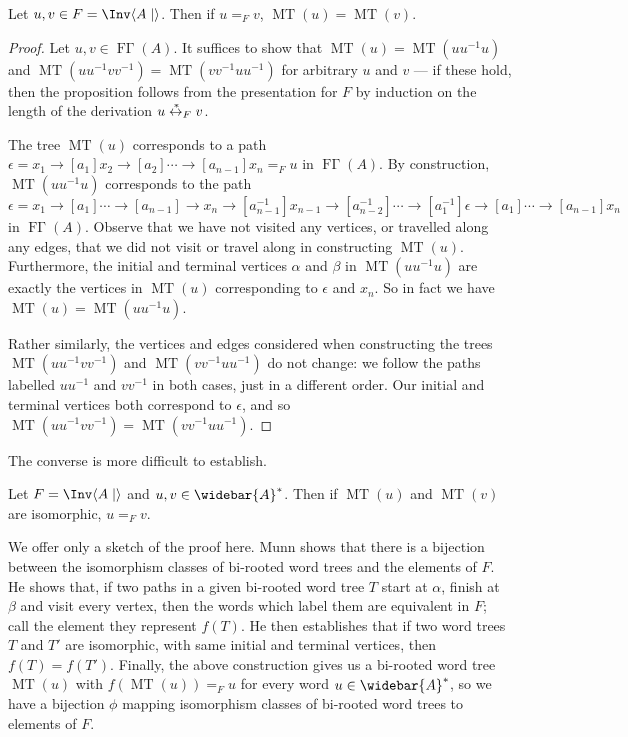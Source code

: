 \documentclass[noindex,noinsetproof,emphthm,12pt]{lmaths}
\newcommand{\leftrightst}{\mathrel{\smash{\stackrel{\hspace{0.1em}\ast}{\leftrightarrow}}}}
\newcommand{\Abar}{\widebar{A}}
\DeclareMathOperator{\FGamma}{F\Gamma}
\DeclareMathOperator{\MT}{MT}
\begin{document}
\begin{prop}
	Let $u, v \in F = \Inv \langle A \mid\rangle$. Then if $u =_F v$, $\MT(u) = \MT(v)$.
\end{prop}
\begin{proof}
	Let $u, v \in \FGamma(A)$. It suffices to show that $\MT(u) = \MT(uu^{-1}u)$ and $\MT(uu^{-1}vv^{-1}) = \MT(vv^{-1}uu^{-1})$ for arbitrary $u$ and $v$ --- if these hold, then the proposition follows from the presentation for $F$ by induction on the length of the derivation $u \leftrightst_{F} v$.

	The tree $\MT(u)$ corresponds to a path $\epsilon = x_1 \to[a_1] x_2 \to[a_2] \cdots \to[a_{n-1}] x_n =_F u$ in $\FGamma(A)$. By construction, $\MT(uu^{-1}u)$ corresponds to the path $\epsilon = x_1 \to[a_1] \cdots \to[a_{n-1}] \to x_n \to[a_{n-1}^{-1}] x_{n-1} \to[a_{n-2}^{-1}] \cdots \to[a_1^{-1}] \epsilon \to[a_1] \cdots \to[a_{n-1}] x_n$ in $\FGamma(A)$. Observe that we have not visited any vertices, or travelled along any edges, that we did not visit or travel along in constructing $\MT(u)$. Furthermore, the initial and terminal vertices $\alpha$ and $\beta$ in $\MT(uu^{-1}u)$ are exactly the vertices in $\MT(u)$ corresponding to $\epsilon$ and $x_n$. So in fact we have $\MT(u) = \MT(uu^{-1}u)$.

	Rather similarly, the vertices and edges considered when constructing the trees $\MT(uu^{-1}vv^{-1})$ and $\MT(vv^{-1}uu^{-1})$ do not change: we follow the paths labelled $uu^{-1}$ and $vv^{-1}$ in both cases, just in a different order. Our initial and terminal vertices both correspond to $\epsilon$, and so $\MT(uu^{-1}vv^{-1}) = \MT(vv^{-1}uu^{-1})$.
\end{proof}

The converse is more difficult to establish.
\begin{prop}
	Let $F = \Inv \langle A \mid\rangle$ and $u, v \in \Abar^*$. Then if $\MT(u)$ and $\MT(v)$ are isomorphic, $u =_F v$.\label{prop:MT-isomorphic-u=Fv}
\end{prop}
We offer only a sketch of the proof here. Munn shows that there is a bijection between the isomorphism classes of bi-rooted word trees and the elements of $F$. He shows that, if two paths in a given bi-rooted word tree $T$ start at $\alpha$, finish at $\beta$ and visit every vertex, then the words which label them are equivalent in $F$; call the element they represent $f(T)$. He then establishes that if two word trees $T$ and $T'$ are isomorphic, with same initial and terminal vertices, then $f(T) = f(T')$. Finally, the above construction gives us a bi-rooted word tree $\MT(u)$ with $f(\MT(u)) =_F u$ for every word $u \in \Abar^*$, so we have a bijection $\phi$ mapping isomorphism classes of bi-rooted word trees to elements of $F$.
\end{document}
